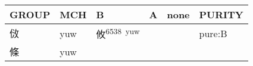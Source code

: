 \documentclass[14pt,a4paper]{scrartcl}
\begin{document}
\begin{longtable}[c]{@{}llllll@{}}
\toprule
\begin{minipage}[b]{0.14\columnwidth}\raggedright\strut
GROUP
\strut\end{minipage} &
\begin{minipage}[b]{0.14\columnwidth}\raggedright\strut
MCH
\strut\end{minipage} &
\begin{minipage}[b]{0.14\columnwidth}\raggedright\strut
B
\strut\end{minipage} &
\begin{minipage}[b]{0.14\columnwidth}\raggedright\strut
A
\strut\end{minipage} &
\begin{minipage}[b]{0.14\columnwidth}\raggedright\strut
none
\strut\end{minipage} &
\begin{minipage}[b]{0.14\columnwidth}\raggedright\strut
PURITY
\strut\end{minipage}\tabularnewline
\midrule
\endhead
\begin{minipage}[t]{0.14\columnwidth}\raggedright\strut
𠈹
\strut\end{minipage} &
\begin{minipage}[t]{0.14\columnwidth}\raggedright\strut
yuw
\strut\end{minipage} &
\begin{minipage}[t]{0.14\columnwidth}\raggedright\strut
攸\textsuperscript{6538~yuw}
\strut\end{minipage} &
\begin{minipage}[t]{0.14\columnwidth}\raggedright\strut
\strut\end{minipage} &
\begin{minipage}[t]{0.14\columnwidth}\raggedright\strut
\strut\end{minipage} &
\begin{minipage}[t]{0.14\columnwidth}\raggedright\strut
pure:B
\strut\end{minipage}\tabularnewline
\begin{minipage}[t]{0.14\columnwidth}\raggedright\strut
條
\strut\end{minipage} &
\begin{minipage}[t]{0.14\columnwidth}\raggedright\strut
yuw
\strut\end{minipage} &
\begin{minipage}[t]{0.14\columnwidth}\raggedright\strut
\strut\end{minipage} &
\begin{minipage}[t]{0.14\columnwidth}\raggedright\strut

\end{minipage}
\end{longtable}
\end{document}
